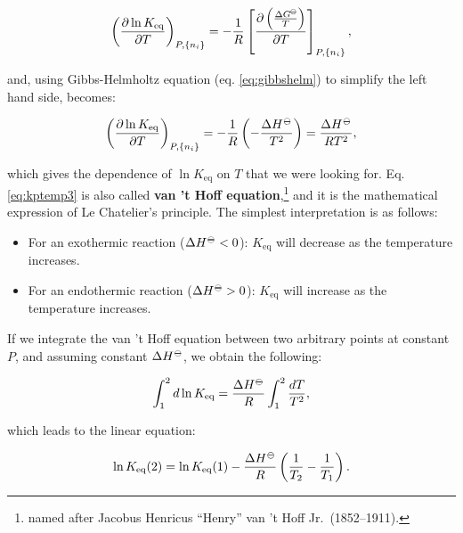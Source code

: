 \documentclass[
  9pt,
]{extbook}
\providecommand{\tightlist}{%
  \setlength{\itemsep}{0pt}\setlength{\parskip}{0pt}}
\theoremstyle{definition}
\theoremstyle{definition}
\theoremstyle{definition}
\theoremstyle{remark}
\begin{document}
\begin{equation}
\left( \frac{\partial \ln K_{\text{eq}}}{\partial T} \right)_{P,\{n_i\}} = -\frac{1}{R}  \left[ \frac{\partial \left( \frac{\Delta G^{-\kern-6pt{\ominus}\kern-6pt-}}{T} \right)}{\partial T} \right]_{P,\{n_i\}},
\label{eq:kptemp2}
\end{equation}

and, using Gibbs-Helmholtz equation (eq. \eqref{eq:gibbshelm}) to simplify the left hand side, becomes:

\begin{equation}
\left( \frac{\partial \ln K_{\text{eq}}}{\partial T} \right)_{P,\{n_i\}} = -\frac{1}{R} \left( -\frac{\Delta H^{-\kern-6pt{\ominus}\kern-6pt-}}{T^2} \right) = \frac{\Delta H^{-\kern-6pt{\ominus}\kern-6pt-}}{RT^2},
\label{eq:kptemp3}
\end{equation}

which gives the dependence of \(\ln K_{\text{eq}}\) on \(T\) that we were looking for. Eq. \eqref{eq:kptemp3} is also called \textbf{van 't Hoff equation},\footnote{named after Jacobus Henricus ``Henry'' van 't Hoff Jr.~(1852--1911).} and it is the mathematical expression of Le Chatelier's principle. The simplest interpretation is as follows:

\begin{itemize}
\tightlist
\item
  For an exothermic reaction (\(\Delta H^{-\kern-6pt{\ominus}\kern-6pt-}< 0\)): \(K_{\text{eq}}\) will decrease as the temperature increases.
\item
  For an endothermic reaction (\(\Delta H^{-\kern-6pt{\ominus}\kern-6pt-}> 0\)): \(K_{\text{eq}}\) will increase as the temperature increases.
\end{itemize}

If we integrate the van 't Hoff equation between two arbitrary points at constant \(P\), and assuming constant \(\Delta H^{-\kern-6pt{\ominus}\kern-6pt-}\), we obtain the following:

\begin{equation}
\int_1^2 d \ln K_{\text{eq}} = \frac{\Delta H^{-\kern-6pt{\ominus}\kern-6pt-}}{R} \int_1^2 \frac{dT}{T^2},
\label{eq:kptemp4}
\end{equation}

which leads to the linear equation:

\begin{equation}
\ln K_{\text{eq}}(2) = \ln K_{\text{eq}}(1) - \frac{\Delta H^{-\kern-6pt{\ominus}\kern-6pt-}}{R} \left( \frac{1}{T_2}-\frac{1}{T_1} \right).
\label{eq:vthoffeqI}
\end{equation}
\end{document}
